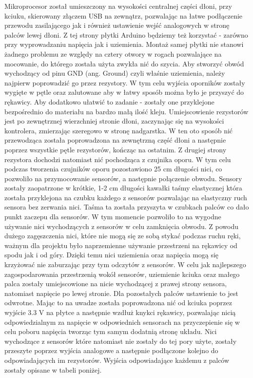 Mikroprocesor został umieszczony na wysokości centralnej części dłoni, przy kciuku, skierowany złączem USB na zewnątrz, pozwalając na łatwe podłączenie przewodu zasilającego jak i również ustawienie wejść analogowych w stronę palców lewej dłoni. Z tej strony płytki Arduino będziemy też korzystać - zarówno przy wyprowadzaniu napięcia jak i uziemienia. Montaż samej płytki nie stanowi żadnego problemu ze względy na cztery otwory w rogach pozwalające na mocowanie, do którego została użyta zwykła nić do szycia. Aby stworzyć obwód wychodzący od pinu GND (ang. Ground) czyli właśnie uziemienia, należy najpierw poprowadzić go przez rezystory. W tym celu wyjścia oporników zostały wygięte w pętle oraz zalutowane aby w łatwy sposób można było je przyszyć do rękawicy. Aby dodatkowo ułatwić to zadanie - zostały one przyklejone bezpośrednio do materiału na bardzo małą ilość kleju. Umiejscowienie rezystorów jest po zewnętrznej wierzchniej stronie dłoni, zaczynając się na wysokości kontrolera, zmierzając szeregowo w stronę nadgarstka. W ten oto sposób nić przewodząca została poprowadzona na zewnętrzną część dłoni a następnie poprzez wszystkie pętle rezystorów, kończąc na ostatnim. Z drugiej strony rezystora dochodzi natomiast nić pochodząca z czujnika oporu. W tym celu podczas tworzenia czujników oporu pozostawiono 25 cm długości nici, co pozwoliło na przymocowanie sensorów, a następnie połączenie obwodu. Sensory zostały zaopatrzone w krótkie, 1-2 cm długości kawałki taśmy elastycznej która została przyklejona na czubku każdego z sensorów pozwalając na elastyczny ruch sensora bez zerwania nici. Taśma ta została przyszyta w czubkach palców co dało punkt zaczepu dla sensorów. W tym momencie pozwoliło to na wygodne używanie nici wychodzących z sensorów w celu zamknięcia obwodu. Z powodu dużego zagęszczenia nici, które nie mogą się ze sobą stykać podczas ruchu ręki, ważnym dla projektu było naprzemienne używanie przestrzeni na rękawicy od spodu jak i od góry. Dzięki temu nici uziemienia oraz napięcia mogą się krzyżować nie zaburzając przy tym odczytów z sensorów. W celu jak najlepszego zagospodarowania przestrzenią wokół sensorów, uziemienie kciuka oraz małego palca zostały umiejscowione na nicie wychodzącej z prawej strony sensora, natomiast napięcie po lewej stronie. Dla pozostałych palców ustawienie to jest odwrotne. Mając to na uwadze została poprowadzona nić od kciuka poprzez wyjście 3.3 V na płytce a następnie wzdłuż knykci rękawicy, pozwalając nicią odpowiedzialnym za napięcie w odpowiednich sensorach na przyczepienie się w celu poboru napięcia tworząc tym samym dodatnią stronę układu. Nici wychodzące z sensorów które natomiast nie zostały do tej pory użyte, zostały przeszyte poprzez wyjścia analogowe a następnie podłączone kolejno do odpowiadających im rezystorów. Wyjścia odpowiadające każdemu z palców zostały opisane w tabeli poniżej. 

